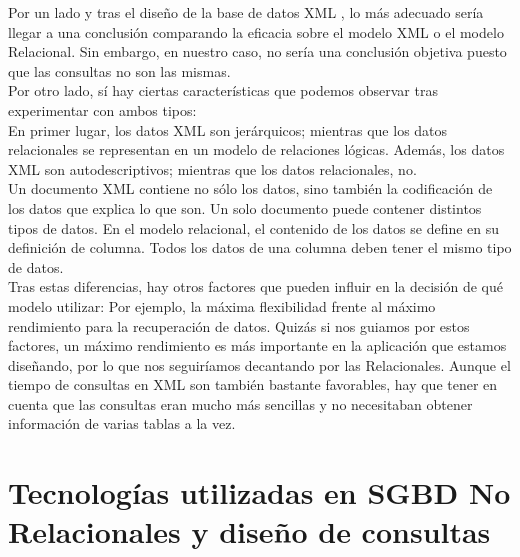 \documentclass[12pt,a4paper]{article}
\begin{document}
Por un lado y tras el diseño de la base de datos XML , lo más adecuado sería llegar a una conclusión comparando la eficacia sobre el modelo XML o el modelo Relacional. Sin embargo, en nuestro caso, no sería una conclusión objetiva puesto que las consultas no son las mismas.\\

Por otro lado, sí hay ciertas características que podemos observar tras experimentar con ambos tipos:\\

En primer lugar, los datos XML son jerárquicos; mientras que los datos relacionales se representan en un modelo de relaciones lógicas. Además, los datos XML son autodescriptivos; mientras que los datos relacionales, no.\\

Un documento XML contiene no sólo los datos, sino también la codificación de los datos que explica lo que son. Un solo documento puede contener distintos tipos de datos. En el modelo relacional, el contenido de los datos se define en su definición de columna. Todos los datos de una columna deben tener el mismo tipo de datos.\\

Tras estas diferencias, hay otros factores que pueden influir en la decisión de qué modelo utilizar: Por ejemplo, la máxima flexibilidad frente al máximo rendimiento para la recuperación de datos. Quizás si nos guiamos por estos factores, un máximo rendimiento es más importante en la aplicación que estamos diseñando, por lo que nos seguiríamos decantando por las Relacionales. Aunque el tiempo de consultas en XML son también bastante favorables, hay que tener en cuenta que las consultas eran mucho más sencillas y no necesitaban obtener información de varias tablas a la vez.




\newpage
\mbox{}
\newpage


\section{Tecnologías utilizadas en SGBD No Relacionales y diseño de consultas} \label{pto5} 

\end{document}
